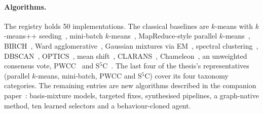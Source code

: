 \documentclass[11pt,a4paper]{article}
\begin{document}
\paragraph{Algorithms.} The registry holds 50 implementations. The classical
baselines are $k$-means with $k$-means++ seeding~\cite{lloyd1982least,arthur2007kmeanspp},
mini-batch $k$-means~\cite{sculley2010web}, MapReduce-style parallel
$k$-means~\cite{zhao2009parallel}, BIRCH~\cite{zhang1996birch}, Ward
agglomerative~\cite{ward1963hierarchical}, Gaussian mixtures via
EM~\cite{dempster1977maximum}, spectral clustering~\cite{ng2002spectral},
DBSCAN~\cite{ester1996density}, OPTICS~\cite{ankerst1999optics}, mean
shift~\cite{comaniciu2002mean}, CLARANS~\cite{ng2002clarans},
Chameleon~\cite{karypis1999chameleon}, an unweighted consensus vote,
PWCC~\cite{alguliyev2020weighted} and S$^5$C~\cite{matsushima2019s5c}. The
last four of the thesis's representatives (parallel $k$-means, mini-batch,
PWCC and S$^5$C) cover its four taxonomy categories. The remaining entries are
new algorithms described in the companion paper~\cite{clustbenchalgos}:
basis-mixture models, targeted fixes, synthesised pipelines, a graph-native
method, ten learned selectors and a behaviour-cloned agent.
\end{document}

